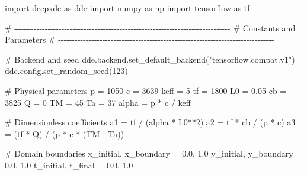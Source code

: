 \documentclass[
  spanish,
  us-letterpaper,
  DIV=11,
  numbers=noendperiod]{scrreprt}
\newenvironment{Shaded}{\begin{snugshade}}{\end{snugshade}}
\newcommand{\CommentTok}[1]{\textcolor[rgb]{0.37,0.37,0.37}{#1}}
\newcommand{\DecValTok}[1]{\textcolor[rgb]{0.68,0.00,0.00}{#1}}
\newcommand{\FloatTok}[1]{\textcolor[rgb]{0.68,0.00,0.00}{#1}}
\newcommand{\ImportTok}[1]{\textcolor[rgb]{0.00,0.46,0.62}{#1}}
\newcommand{\NormalTok}[1]{\textcolor[rgb]{0.00,0.23,0.31}{#1}}
\newcommand{\OperatorTok}[1]{\textcolor[rgb]{0.37,0.37,0.37}{#1}}
\newcommand{\StringTok}[1]{\textcolor[rgb]{0.13,0.47,0.30}{#1}}
\theoremstyle{definition}
\theoremstyle{plain}
\theoremstyle{remark}
\begin{document}
\begin{Shaded}
\begin{Highlighting}[]
\ImportTok{import}\NormalTok{ deepxde }\ImportTok{as}\NormalTok{ dde}
\ImportTok{import}\NormalTok{ numpy }\ImportTok{as}\NormalTok{ np}
\ImportTok{import}\NormalTok{ tensorflow }\ImportTok{as}\NormalTok{ tf}

\CommentTok{\# {-}{-}{-}{-}{-}{-}{-}{-}{-}{-}{-}{-}{-}{-}{-}{-}{-}{-}{-}{-}{-}{-}{-}{-}{-}{-}{-}{-}{-}{-}{-}{-}{-}{-}{-}{-}{-}{-}{-}{-}{-}{-}{-}{-}{-}{-}{-}{-}{-}{-}{-}{-}{-}{-}{-}{-}{-}{-}{-}{-}{-}{-}{-}{-}{-}{-}{-}{-}{-}{-}{-}{-}{-}{-}{-}{-}{-}{-}}
\CommentTok{\# Constants and Parameters}
\CommentTok{\# {-}{-}{-}{-}{-}{-}{-}{-}{-}{-}{-}{-}{-}{-}{-}{-}{-}{-}{-}{-}{-}{-}{-}{-}{-}{-}{-}{-}{-}{-}{-}{-}{-}{-}{-}{-}{-}{-}{-}{-}{-}{-}{-}{-}{-}{-}{-}{-}{-}{-}{-}{-}{-}{-}{-}{-}{-}{-}{-}{-}{-}{-}{-}{-}{-}{-}{-}{-}{-}{-}{-}{-}{-}{-}{-}{-}{-}{-}}

\CommentTok{\# Backend and seed}
\NormalTok{dde.backend.set\_default\_backend(}\StringTok{"tensorflow.compat.v1"}\NormalTok{)}
\NormalTok{dde.config.set\_random\_seed(}\DecValTok{123}\NormalTok{)}

\CommentTok{\# Physical parameters}
\NormalTok{p }\OperatorTok{=} \DecValTok{1050}
\NormalTok{c }\OperatorTok{=} \DecValTok{3639}
\NormalTok{keff }\OperatorTok{=} \DecValTok{5}
\NormalTok{tf }\OperatorTok{=} \DecValTok{1800}
\NormalTok{L0 }\OperatorTok{=} \FloatTok{0.05}
\NormalTok{cb }\OperatorTok{=} \DecValTok{3825}
\NormalTok{Q }\OperatorTok{=} \DecValTok{0}
\NormalTok{TM }\OperatorTok{=} \DecValTok{45}
\NormalTok{Ta }\OperatorTok{=} \DecValTok{37}
\NormalTok{alpha }\OperatorTok{=}\NormalTok{ p }\OperatorTok{*}\NormalTok{ c }\OperatorTok{/}\NormalTok{ keff}

\CommentTok{\# Dimensionless coefficients}
\NormalTok{a1 }\OperatorTok{=}\NormalTok{ tf }\OperatorTok{/}\NormalTok{ (alpha }\OperatorTok{*}\NormalTok{ L0}\OperatorTok{**}\DecValTok{2}\NormalTok{)}
\NormalTok{a2 }\OperatorTok{=}\NormalTok{ tf }\OperatorTok{*}\NormalTok{ cb }\OperatorTok{/}\NormalTok{ (p }\OperatorTok{*}\NormalTok{ c)}
\NormalTok{a3 }\OperatorTok{=}\NormalTok{ (tf }\OperatorTok{*}\NormalTok{ Q) }\OperatorTok{/}\NormalTok{ (p }\OperatorTok{*}\NormalTok{ c }\OperatorTok{*}\NormalTok{ (TM }\OperatorTok{{-}}\NormalTok{ Ta))}

\CommentTok{\# Domain boundaries}
\NormalTok{x\_initial, x\_boundary }\OperatorTok{=} \FloatTok{0.0}\NormalTok{, }\FloatTok{1.0}
\NormalTok{y\_initial, y\_boundary }\OperatorTok{=} \FloatTok{0.0}\NormalTok{, }\FloatTok{1.0}
\NormalTok{t\_initial, t\_final }\OperatorTok{=} \FloatTok{0.0}\NormalTok{, }\FloatTok{1.0}


\end{Highlighting}
\end{Shaded}
\end{document}
